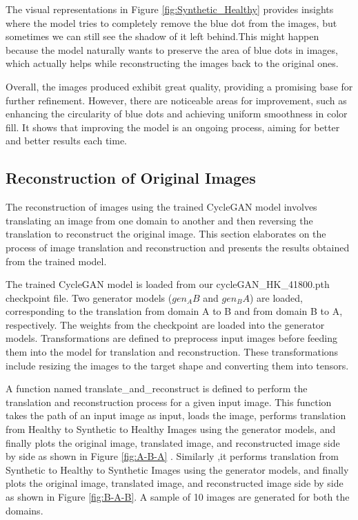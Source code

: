\documentclass[UKenglish,12pt]{master-style}
\begin{document}
The visual representations in Figure \ref{fig:Synthetic_Healthy} provides insights where the model tries to completely remove the blue dot from the images, but sometimes we can still see the shadow  of it left behind.This might happen because the model naturally wants to preserve the area of blue dots in images, which actually helps while reconstructing the images back to the original ones.

Overall, the images produced exhibit great  quality, providing a promising base for further refinement. However, there are noticeable areas for improvement, such as enhancing the circularity of blue dots and achieving uniform smoothness in color fill. It shows that improving the model is an ongoing process, aiming for better and better results each time.


\subsection{Reconstruction of Original Images}

The reconstruction of images using the trained CycleGAN model involves translating an image from one domain to another and then reversing the translation to reconstruct the original image. This section elaborates on the process of image translation and reconstruction and presents the results obtained from the trained model.

The trained CycleGAN model is loaded from our  cycleGAN\_HK\_41800.pth checkpoint file. Two generator models ($gen_AB$ and $gen_BA$) are loaded, corresponding to the translation from domain A to B and from domain B to A, respectively. The weights from the checkpoint are loaded into the generator models. Transformations are defined to preprocess input images before feeding them into the model for translation and reconstruction. These transformations include resizing the images to the target shape and converting them into tensors.

A function named translate\_and\_reconstruct is defined to perform the translation and reconstruction process for a given input image. This function takes the path of an input image as input, loads the image, performs translation from Healthy to Synthetic to Healthy Images using the generator models, and finally plots the original image, translated image, and reconstructed image side by side as shown in Figure \ref{fig:A-B-A} . Similarly ,it performs translation from Synthetic to Healthy to Synthetic Images using the generator models, and finally plots the original image, translated image, and reconstructed image side by side as shown in Figure \ref{fig:B-A-B}. A sample of 10 images are generated for both the domains. 
\end{document}
